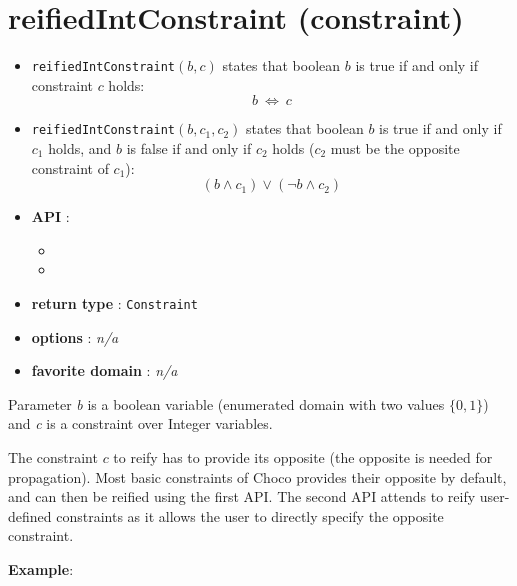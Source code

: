 \label{reifiedintconstraint}
\hypertarget{reifiedintconstraint}{}

\section{reifiedIntConstraint (constraint)}\label{reifiedintconstraint:reifiedintconstraintconstraint}\hypertarget{reifiedintconstraint:reifiedintconstraintconstraint}{}
\begin{notedef}
  \begin{itemize}
  \item \texttt{reifiedIntConstraint}$(b,c)$ states that boolean $b$ is true if and only if constraint $c$ holds:
  $$b\ \iff\ c$$
  \item \texttt{reifiedIntConstraint}$(b,c_1,c_2)$ states that boolean $b$ is true if and only if $c_1$ holds, and $b$ is false if and only if $c_2$ holds ($c_2$ must be the opposite constraint of $c_1$):
$$(b\land c_1) \lor (\neg b \land c_2)$$
  \end{itemize}
\end{notedef}

\begin{itemize}
	\item \textbf{API} :
	\begin{itemize}
		\item {}
		\item {}
	\end{itemize}
	\item \textbf{return type} : \texttt{Constraint}
	\item \textbf{options} : \emph{n/a}
	\item \textbf{favorite domain} : \emph{n/a}
\end{itemize}

Parameter \emph{b} is a boolean variable (enumerated domain with two values $\{0,1\}$) and \emph{c} is a constraint over Integer variables.

The constraint $c$ to reify has to provide its opposite (the opposite is needed for propagation). Most basic constraints of Choco provides their opposite by default, and can then be reified using the first API.
The second API attends to reify user-defined constraints as it allows the user to directly specify the opposite constraint.

\textbf{Example}:


